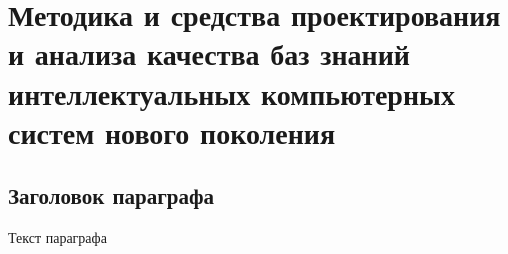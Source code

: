 
\chapter{Методика и средства проектирования и анализа качества баз знаний интеллектуальных компьютерных систем нового поколения}
\label{chapter_kb_design}


\section{Заголовок параграфа}
Текст параграфа

%